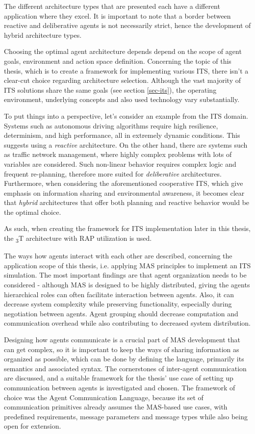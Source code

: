 \documentclass[0main.tex]{subfiles}
\begin{document}
The different architecture types that are presented each have a different application where 
they excel. It is important to note that a border between reactive and deliberative agents 
is not necessarily strict, hence the development of hybrid architecture types. 

Choosing the optimal agent architecture depends depend on the scope of agent goals, 
environment and action space definition. Concerning the topic of this thesis, which is to 
create a framework for implementing various ITS, there isn't a clear-cut choice regarding 
architecture selection. Although the vast majority of ITS solutions share the same goals (see section \ref{sec-its}), 
the operating environment, underlying concepts and also used technology vary substantially.

To put things into a perspective, let's consider an example from the ITS domain. 
Systems such as autonomous driving algorithms require high resilience, determinism, 
and high performance, all in extremely dynamic conditions. This suggests using a
\emph{reactive} architecture. On the other hand, there are systems such as traffic network management, 
where highly complex problems with lots of variables are considered. Such non-linear behavior 
requires complex logic and frequent re-planning, therefore more suited for \emph{deliberative}
architectures. Furthermore, when considering the aforementioned cooperative ITS, which give emphasis 
on information sharing and environmental awareness, it becomes clear that \emph{hybrid} 
architectures that offer both planning and reactive behavior would be the optimal choice.

As such, when creating the framework for ITS implementation later in this thesis, the
\textsubscript{3}T architecture with RAP utilization is used.  

The ways how agents interact with each other are described, concerning the application scope of
this thesis, i.e. applying MAS principles to implement an ITS simulation. The most important
findings are that agent organization needs to be considered - although MAS is designed to be
highly distributed, giving the agents hierarchical roles can often facilitate interaction
between agents. Also, it can decrease system complexity while preserving functionality, especially
during negotiation between agents. Agent grouping should decrease computation and communication
overhead while also contributing to decreased system distribution. 

Designing how agents communicate is a crucial part of MAS development
that can get complex, so it is important to keep the ways of sharing information as organized
as possible, which can be done by defining the language, primarily its semantics and associated
syntax. The cornerstones of inter-agent communication are discussed, and a suitable framework
for the thesis' use case of setting up communication between agents is investigated and
chosen. The framework of choice was the Agent Communication Language, because its set of
communication primitives already assumes the MAS-based use cases, with predefined requirements,
message parameters and message types while also being open for extension.
\end{document}
